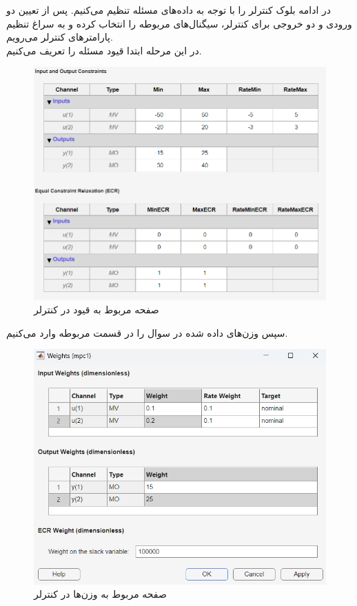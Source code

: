 \documentclass[14pt, a4paper]{extarticle}
\begin{document}
در ادامه بلوک کنترلر را با توجه به داده‌های مسئله تنظیم می‌کنیم. پس از تعیین دو ورودی و دو خروجی برای کنترلر، سیگنال‌های مربوطه را انتخاب کرده و به سراغ تنظیم پارامترهای کنترلر می‌رویم.\\
در این مرحله ابتدا قیود مسئله را تعریف می‌کنیم.\\
	\begin{figure}[h!]
	\centering
	\includegraphics[scale = 0.6]{Q2_sim_constraints.png}
	\caption{صفحه مربوط به قیود در کنترلر}
	\end{figure}

\newpage
سپس وزن‌های داده شده در سوال را در قسمت مربوطه وارد می‌کنیم.\\
	\begin{figure}[h!]
	\centering
	\includegraphics[scale = 0.6]{Q2_sim_weights.png}
	\caption{صفحه مربوط به وزن‌ها در کنترلر}
	\end{figure}
\end{document}
